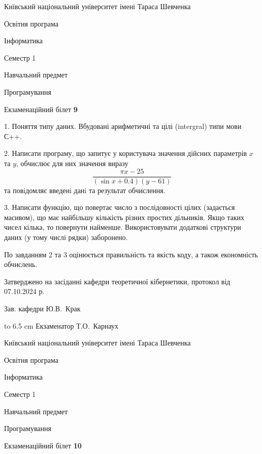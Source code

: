 \documentclass[12pt, ukrainian]{article}
\begin{document}
\vspace{0.9cm}
{{\begin {scriptsize}\par
{ \center  Київський національний університет імені Тараса Шевченка \par}
{\parbox {5 cm}{Освітня програма \hfill}{\parbox {7 cm}{Інформатика\hfill}}\parbox {6 cm}{\hfill Семестр 1}}\par
{\parbox {5 cm} {Навчальний предмет \hfill}\parbox {7 cm}{Програмування \hfill}\parbox {6cm}{\hfill}\par}\vspace{-15pt} \end{scriptsize}}{\center Екзаменаційний білет \No \textbf { 9 }\par}}
{%
1. Поняття типу даних. Вбудовані арифметичні та цілі (intergral) типи мови С++.%
\par
2. Написати програму, що запитує у користувача значення дійсних параметрів $x$ та $y$, обчислює для них значення виразу 
$$\frac{\pi x - 25}{(\sin x + 0.4) (y - 61)}$$ 
та повiдомляє введенi данi та результат обчислення.

\par
3. Написати функцію, що повертає число з послідовності цілих (задається масивом), що має найбільшу кількість різних простих дільників. Якщо таких чисел кілька, то повернути найменше. Використовувати додаткові структури даних (у тому числі рядки) заборонено.

По завданням 2 та 3 оцінюється правильність та якість коду, а також економність обчислень.

}
{\smallskip\smallskip \begin {scriptsize} Затверджено на засіданні кафедри теоретичної кібернетики, протокол   від   07.10.2024 р.\par\smallskip\smallskip\smallskip\smallskip
{\parbox {6.5 cm} {Зав. кафедри \dotfill Ю.В.~Крак}}\hspace {0.7cm} {\hbox to 6.5 cm { Екзаменатор \dotfill Т.О.~Карнаух}} \end{scriptsize}}
\newpage
{{\begin {scriptsize}\par
{ \center  Київський національний університет імені Тараса Шевченка \par}
{\parbox {5 cm}{Освітня програма \hfill}{\parbox {7 cm}{Інформатика\hfill}}\parbox {6 cm}{\hfill Семестр 1}}\par
{\parbox {5 cm} {Навчальний предмет \hfill}\parbox {7 cm}{Програмування \hfill}\parbox {6cm}{\hfill}\par}\vspace{-15pt} \end{scriptsize}}{\center Екзаменаційний білет \No \textbf { 10 }\par}}
\end{document}
